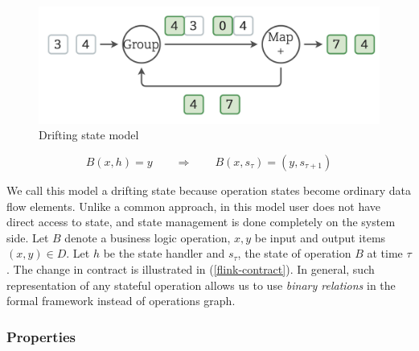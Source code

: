 \begin{figure}[htbp]
  \centering
  \includegraphics[width=\columnwidth]{pics/classical-drifting2}
  \caption{Drifting state model}
  \label {classical-drifting2}
\end{figure}

\begin{equation}
  \label{flink-contract}
  B(x, h) = y \qquad\Longrightarrow\qquad B(x, s_{\tau}) = (y, s_{\tau+1}) 
\end{equation}

We call this model a drifting state because operation states become ordinary data flow elements. Unlike a common approach, in this model user does not have direct access to state, and state management is done completely on the system side. Let $B$ denote a business logic operation, $x, y$ be input and output items $(x,y)\in D$. Let $h$ be the state handler and $s_\tau$, the state of operation $B$ at time $\tau$. The change in contract is illustrated in (\ref{flink-contract}). In general, such representation of any stateful operation allows us to use {\em binary relations} in the formal framework instead of operations graph.

\subsubsection{Properties}

